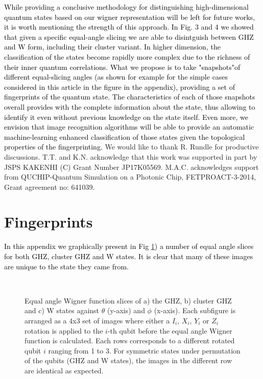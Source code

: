 \documentclass[pra,reprint,showkeys,showpacs,times,superscriptaddress]{revtex4-1}
\newcommand{\red}{\textcolor{black}}
\begin{document}
\red{While providing a conclusive methodology for distinguishing high-dimensional quantum states based on our wigner representation will be left for future works, it is worth mentioning the strength of this approach. In Fig. 3 and 4 we showed that given a specific equal-angle slicing we are able to disintguish between GHZ and W form, including their cluster variant. In higher dimension, the classification of the states become rapidly more complex due to the richness of their inner quantum correlations.  What we propose is to take "snapshots"of different equal-slicing angles (as shown for example for the simple cases considered in this article in the figure in the appendix), providing a set of fingerprints of the quantum state. The characteristics of each of those snapshots overall provides with the complete information about the state, thus allowing to identify it even without previous knowledge on the state itself. Even more, we envision that image recognition algorithms will be able to provide an automatic machine-learning enhanced classification of those states given the topological properties of the fingerprinting. } 
\acknowledgments
We would like to thank R. Rundle for productive discussions. 
T.T. and K.N. acknowledge that this work was supported in part by JSPS KAKENHI (C) Grant Number JP17K05569.
M.A.C. acknowledges support from QUCHIP-Quantum Simulation on a Photonic Chip, FETPROACT-3-2014, Grant agreement no: 641039.


\appendix
\section{Fingerprints}\label{appendixa}
\red{In this appendix we graphically present in Fig \ref{figappendix}) a number of equal angle slices for both  GHZ, cluster GHZ and W states. It is clear that many of these images are unique to the state they came from. }

\begin{figure}[htb]
\begin{center}
\\
\end{center}
\caption{Equal angle Wigner function slices of a) the GHZ, b) cluster GHZ and c) W states against $\theta$ (y-axis) and $\phi$ (x-axis). Each subfigure is arranged as a 4x3 set of images where either a $I_i$, $X_i$, $Y_i$ or $Z_i$ rotation is applied to the $i$-th qubit before the equal angle Wigner function is calculated. Each rows corresponds to a different rotated qubit $i$ ranging from 1 to 3. For symmetric states under permutation of the qubits (GHZ and W states), the images in the different row are identical as expected.}
\label{figappendix} 
\end{figure}



  


\end{document}
